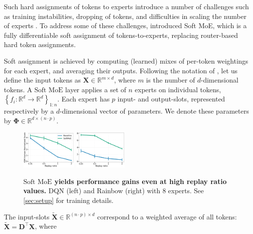 \documentclass{article}
\theoremstyle{plain}
\theoremstyle{definition}
\theoremstyle{remark}
\newcommand{\softmoe}{$\textrm{Soft MoE}$}
\begin{document}
Such hard assignments of tokens to experts introduce a number of challenges such as training instabilities, dropping of tokens, and difficulties in scaling the number of experts \citep{fedus2022switch,puigcerver2023sparse}. To address some of these challenges, \citet{puigcerver2023sparse} introduced Soft MoE, which is a fully differentiable soft assignment of tokens-to-experts, replacing router-based hard token assignments. 

Soft assignment is achieved by computing (learned) mixes of per-token weightings for each expert, and averaging their outputs. Following the notation of \citet{puigcerver2023sparse}, let us define the input tokens as $\mathbf{X} \in \mathbb{R}^{m \times d}$, where $m$ is the number of $d$-dimensional tokens. A \softmoe{} layer applies a set of $n$ experts on individual tokens, $\left\{f_i: \mathbb{R}^d \rightarrow \mathbb{R}^d\right\}_{1: n}$. Each expert has $p$ input- and output-slots, represented respectively by a $d$-dimensional vector of parameters.  We denote these parameters by $\boldsymbol{\Phi} \in \mathbb{R}^{d \times(n \cdot p)}$.


\ifarxiv
    \begin{figure}[!t]
        \centering
        \includegraphics[width=0.245\textwidth]{figures/MOEs_replayratio_dqn_experts8CORR_COLOR2.pdf}%
        \includegraphics[width=0.235\textwidth]{figures/MOEs_replayratio_rainbow_experts8CORR_COLOR2.pdf}%
        \vspace{-0.4cm}
        \caption{\textbf{\softmoe{} yields performance gains even at high replay ratio values.} DQN (left) and Rainbow (right) with 8 experts. See \cref{sec:setup} for training details.}
        \label{fig:replayRatioPlots}
        \vspace{-0.2cm}
    \end{figure}
\fi

The input-slots $\tilde{\mathbf{X}} \in \mathbb{R}^{(n \cdot p) \times d}$ correspond to a weighted average of all tokens: $\tilde{\mathbf{X}}=\mathbf{D}^{\top} \mathbf{X}$, where
\end{document}
